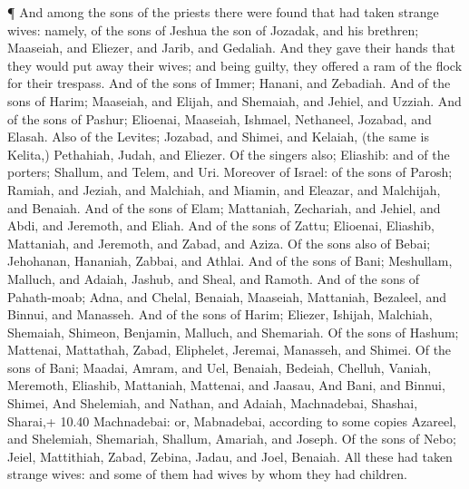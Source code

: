  ¶ And among the sons of the priests there were found that
had taken strange wives: namely, of the sons of Jeshua the son of
Jozadak, and his brethren; Maaseiah, and Eliezer, and Jarib, and
Gedaliah.  And they gave their hands that they would put
away their wives; and being guilty, they offered a ram of the flock for
their trespass.  And of the sons of Immer; Hanani, and
Zebadiah.  And of the sons of Harim; Maaseiah, and Elijah,
and Shemaiah, and Jehiel, and Uzziah.  And of the sons of
Pashur; Elioenai, Maaseiah, Ishmael, Nethaneel, Jozabad, and Elasah.
 Also of the Levites; Jozabad, and Shimei, and Kelaiah,
(the same is Kelita,) Pethahiah, Judah, and Eliezer.  Of
the singers also; Eliashib: and of the porters; Shallum, and Telem, and
Uri.  Moreover of Israel: of the sons of Parosh; Ramiah,
and Jeziah, and Malchiah, and Miamin, and Eleazar, and Malchijah, and
Benaiah.  And of the sons of Elam; Mattaniah, Zechariah,
and Jehiel, and Abdi, and Jeremoth, and Eliah.  And of the
sons of Zattu; Elioenai, Eliashib, Mattaniah, and Jeremoth, and Zabad,
and Aziza.  Of the sons also of Bebai; Jehohanan, Hananiah,
Zabbai, and Athlai.  And of the sons of Bani; Meshullam,
Malluch, and Adaiah, Jashub, and Sheal, and Ramoth.  And of
the sons of Pahath-moab; Adna, and Chelal, Benaiah, Maaseiah, Mattaniah,
Bezaleel, and Binnui, and Manasseh.  And of the sons of
Harim; Eliezer, Ishijah, Malchiah, Shemaiah, Shimeon, 
Benjamin, Malluch, and Shemariah.  Of the sons of Hashum;
Mattenai, Mattathah, Zabad, Eliphelet, Jeremai, Manasseh, and Shimei.
 Of the sons of Bani; Maadai, Amram, and Uel, 
Benaiah, Bedeiah, Chelluh,  Vaniah, Meremoth, Eliashib,
 Mattaniah, Mattenai, and Jaasau,  And Bani,
and Binnui, Shimei,  And Shelemiah, and Nathan, and Adaiah,
 Machnadebai, Shashai, Sharai,+ 10.40 Machnadebai: or,
Mabnadebai, according to some copies  Azareel, and
Shelemiah, Shemariah,  Shallum, Amariah, and Joseph.
 Of the sons of Nebo; Jeiel, Mattithiah, Zabad, Zebina,
Jadau, and Joel, Benaiah.  All these had taken strange
wives: and some of them had wives by whom they had children.
